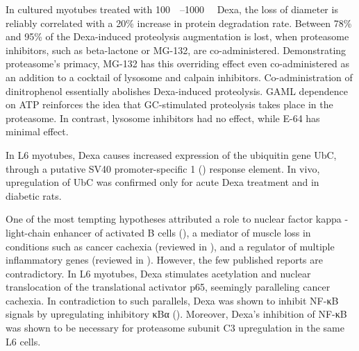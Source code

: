 \documentclass[12pt,english]{report}\usepackage[]{graphicx}\usepackage[]{color}
\begin{document}
In cultured myotubes treated with \SIrange{100}{1000}{\nano\molar}
Dexa, the loss of diameter is reliably correlated with a 20\% increase
in protein degradation rate\citep{wang1998dexamethasone,menconi2008dexamethasone}.
Between 78\% and 95\% of the Dexa-induced proteolysis augmentation
is lost, when proteasome inhibitors, such as beta-lactone or MG-132,
are co-administered\citep{wang1998dexamethasone,thompson1999stimulation}.
Demonstrating proteasome's primacy, MG-132 has this overriding effect
even co-administered as an addition to a cocktail of lysosome and
calpain inhibitors\citep{combaret2004glucocorticoids}. Co-administration
of dinitrophenol essentially abolishes Dexa-induced proteolysis\citep{wang1998dexamethasone}.
GAML dependence on ATP reinforces the idea that GC-stimulated proteolysis
takes place in the proteasome. In contrast, lysosome inhibitors had
no effect, while E-64 has minimal effect\citep{wang1998dexamethasone}.

In L6 myotubes, Dexa causes increased expression of the ubiquitin
gene UbC, through a putative SV40 promoter-specific 1 ()
response element\citep{marinovic2000tools}. In vivo, upregulation
of UbC was confirmed only for acute Dexa treatment\citep{wing1993glucocorticoids}
and in diabetic rats\citep{zheng2010foxo3a}.

One of the most tempting hypotheses attributed a role to nuclear factor
kappa - light-chain enhancer of activated B cells (),
a mediator of muscle loss in conditions such as cancer cachexia (reviewed
in \citep{tisdale2008catabolic}), and a regulator of multiple inflammatory
genes (reviewed in \citep{peterson2008skeletal}). However, the few
published reports are contradictory. In L6 myotubes, Dexa stimulates
acetylation and nuclear translocation of the translational activator
p65\citep{chamberlain2012multiple}, seemingly paralleling cancer
cachexia. In contradiction to such parallels, Dexa was shown to inhibit
NF-κB signals by upregulating inhibitory κBα ()\citep{luo2001heat}.
Moreover, Dexa's inhibition of NF-κB was shown to be necessary for
proteasome subunit C3 upregulation in the same L6 cells\citep{du2000glucocorticoids}.
\end{document}
